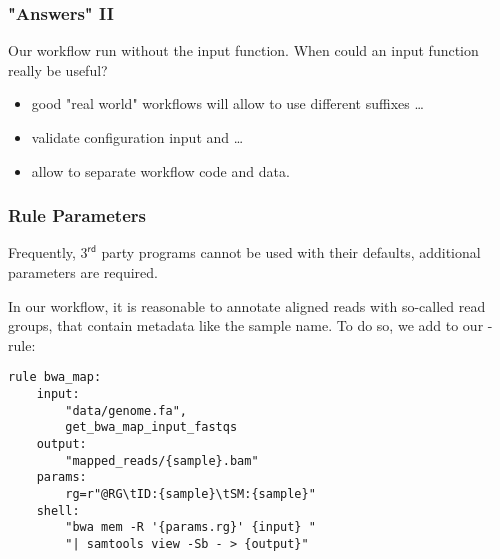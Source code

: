 \begin{frame}[fragile]
	\frametitle{"Answers" II}
	\begin{question}
    		Our workflow run without the input function. When could an input function really be useful?
	\end{question}
	\pause
	\begin{itemize}[<+->]
		\item good "real world" workflows will allow to use different suffixes \ldots
		\item validate configuration input and \ldots
		\item allow to separate workflow code and data.
	\end{itemize}
\end{frame}

\begin{frame}[fragile]
  \frametitle{Rule Parameters}
  \begin{warning}
  	Frequently, $3^\mathsf{rd}$ party programs cannot be used with their defaults, additional parameters are required.
  \end{warning}
  In our workflow, it is reasonable to annotate aligned reads with so-called read groups, that contain metadata like the sample name. \newline
  To do so, we add to our -rule:
  \begin{lstlisting}[style=Plain,basicstyle=\small]
rule bwa_map:
    input:
        "data/genome.fa",
        get_bwa_map_input_fastqs
    output:
        "mapped_reads/{sample}.bam"
    params:
        rg=r"@RG\tID:{sample}\tSM:{sample}"
    shell:
        "bwa mem -R '{params.rg}' {input} "
        "| samtools view -Sb - > {output}"
  \end{lstlisting}
\end{frame}

